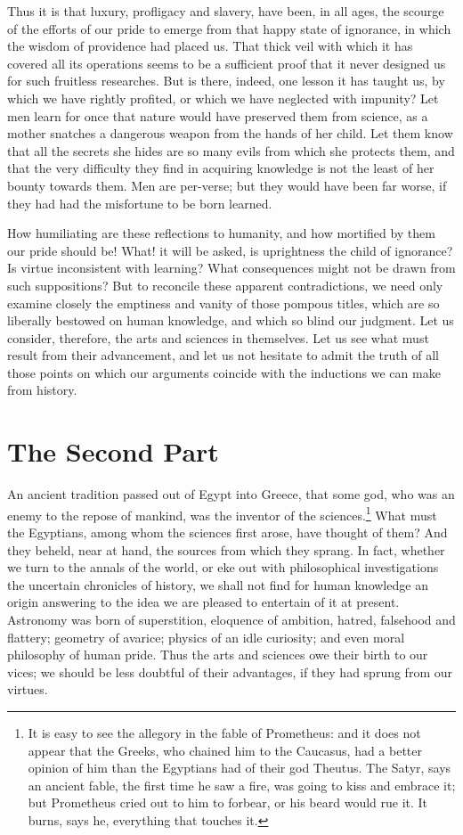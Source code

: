 Thus it is that luxury, profligacy and slavery, have been, in all
ages, the scourge of the efforts of our pride to emerge from that
happy state of ignorance, in which the wisdom of providence had placed
us. That thick veil with which it has covered all its operations seems
to be a sufficient proof that it never designed us for such fruitless
researches. But is there, indeed, one lesson it has taught us, by
which we have rightly profited, or which we have neglected with
impunity? Let men learn for once that nature would have preserved them
from science, as a mother snatches a dangerous weapon from the hands
of her child. Let them know that all the secrets she hides are so many
evils from which she protects them, and that the very difficulty they
find in acquiring knowledge is not the least of her bounty towards
them. Men are per-verse; but they would have been far worse,
if they had had the misfortune to be born learned.

How humiliating are these reflections to humanity, and how mortified
by them our pride should be! What! it will be asked, is uprightness
the child of ignorance? Is virtue inconsistent with learning? What
consequences might not be drawn from such suppositions? But to
reconcile these apparent contradictions, we need only examine closely
the emptiness and vanity of those pompous titles, which are so
liberally bestowed on human knowledge, and which so blind our
judgment. Let us consider, therefore, the arts and sciences in
themselves. Let us see what must result from their advancement, and
let us not hesitate to admit the truth of all those points on which
our arguments coincide with the inductions we can make from history.

\section{The Second Part}

An ancient tradition passed out of Egypt into Greece, that some god,
who was an enemy to the repose of mankind, was the inventor of the
sciences.\footnote{It is easy to see the allegory in the fable of
Prometheus: and it does not appear that the Greeks, who chained him to
the Caucasus, had a better opinion of him than the Egyptians had of
their god Theutus. The Satyr, says an ancient fable, the first time he
saw a fire, was going to kiss and embrace it; but Prometheus cried out
to him to forbear, or his beard would rue it. It burns, says he,
everything that touches it.} What must the Egyptians, among whom the
sciences first arose, have thought of them? And they beheld, near at
hand, the sources from which they sprang. In fact, whether we turn to
the annals of the world, or eke out with philosophical investigations
the uncertain chronicles of history, we shall not find for human
knowledge an origin answering to the idea we are pleased to entertain
of it at present. Astronomy was born of superstition, eloquence of
ambition, hatred, falsehood and flattery; geometry of avarice; physics
of an idle curiosity; and even moral philosophy of human pride. Thus
the arts and sciences owe their birth to our vices; we should be less
doubtful of their advantages, if they had sprung from our virtues.

